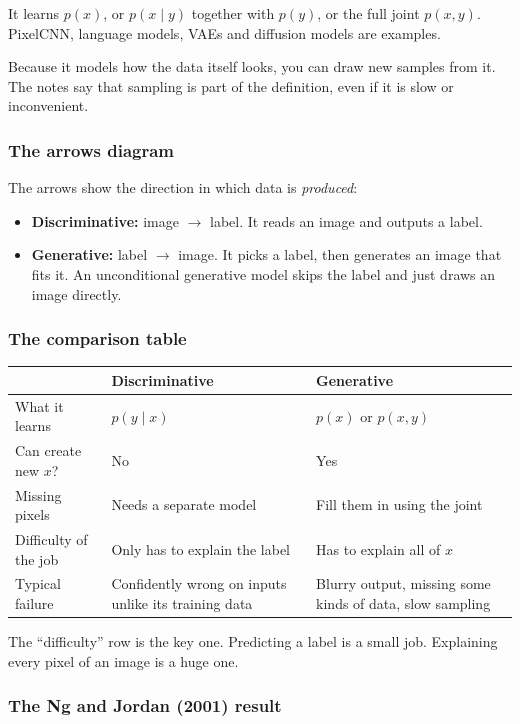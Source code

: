 It learns $p(x)$, or $p(x \mid y)$ together with $p(y)$, or the full joint $p(x, y)$. PixelCNN, language models, VAEs and diffusion models are examples.

Because it models how the data itself looks, you can draw new samples from it. The notes say that sampling is part of the definition, even if it is slow or inconvenient.

\subsubsection*{The arrows diagram}

The arrows show the direction in which data is \emph{produced}:
\begin{itemize}
  \item \textbf{Discriminative:} image $\to$ label. It reads an image and outputs a label.
  \item \textbf{Generative:} label $\to$ image. It picks a label, then generates an image that fits it. An unconditional generative model skips the label and just draws an image directly.
\end{itemize}

\subsubsection*{The comparison table}

\begin{center}
\begin{tabular}{p{3.6cm} p{6.2cm} p{6.2cm}}
\toprule
 & Discriminative & Generative \\
\midrule
What it learns & $p(y \mid x)$ & $p(x)$ or $p(x, y)$ \\
Can create new $x$? & No & Yes \\
Missing pixels & Needs a separate model & Fill them in using the joint \\
Difficulty of the job & Only has to explain the label & Has to explain all of $x$ \\
Typical failure & Confidently wrong on inputs unlike its training data & Blurry output, missing some kinds of data, slow sampling \\
\bottomrule
\end{tabular}
\end{center}

The ``difficulty'' row is the key one. Predicting a label is a small job. Explaining every pixel of an image is a huge one.

\subsubsection*{The Ng and Jordan (2001) result}

